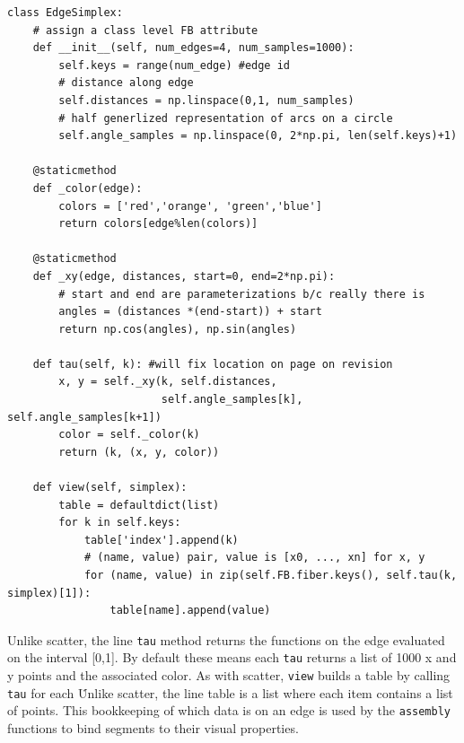 \documentclass[../main.tex]{subfiles}
\begin{document}
\begin{verbatim}
class EdgeSimplex: 
    # assign a class level FB attribute
    def __init__(self, num_edges=4, num_samples=1000): 
        self.keys = range(num_edge) #edge id
        # distance along edge
        self.distances = np.linspace(0,1, num_samples)
        # half generlized representation of arcs on a circle
        self.angle_samples = np.linspace(0, 2*np.pi, len(self.keys)+1)

    @staticmethod
    def _color(edge):
        colors = ['red','orange', 'green','blue']
        return colors[edge%len(colors)]

    @staticmethod
    def _xy(edge, distances, start=0, end=2*np.pi):
        # start and end are parameterizations b/c really there is 
        angles = (distances *(end-start)) + start
        return np.cos(angles), np.sin(angles)

    def tau(self, k): #will fix location on page on revision
        x, y = self._xy(k, self.distances, 
                        self.angle_samples[k], self.angle_samples[k+1]) 
        color = self._color(k) 
        return (k, (x, y, color))

    def view(self, simplex):
        table = defaultdict(list)
        for k in self.keys:
            table['index'].append(k)
            # (name, value) pair, value is [x0, ..., xn] for x, y
            for (name, value) in zip(self.FB.fiber.keys(), self.tau(k, simplex)[1]):
                table[name].append(value)
\end{verbatim}
Unlike scatter, the line \texttt{tau} method returns the functions on the edge evaluated on the interval [0,1]. By default these means each \texttt{tau} returns a list of 1000 x and y points and the associated color. As with scatter, \texttt{view} builds a table by calling \texttt{tau} for each \dbasepoint\. Unlike scatter, the line table is a list where each item contains a list of points. This bookkeeping of which data is on an edge is used by the \texttt{assembly} functions to bind segments to their visual properties. 
\end{document}
